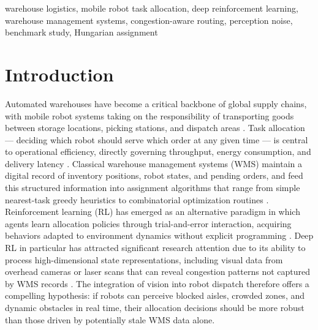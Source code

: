 \documentclass[conference]{IEEEtran}
\begin{document}
\begin{IEEEkeywords}
warehouse logistics, mobile robot task allocation, deep reinforcement learning, warehouse management systems, congestion-aware routing, perception noise, benchmark study, Hungarian assignment
\end{IEEEkeywords}


\section{Introduction}

Automated warehouses have become a critical backbone of global supply chains, with mobile robot systems taking on the responsibility of transporting goods between storage locations, picking stations, and dispatch areas \cite{wurman2008coordinating}.
Task allocation --- deciding which robot should serve which order at any given time --- is central to operational efficiency, directly governing throughput, energy consumption, and delivery latency \cite{boysen2019warehousing}.
Classical warehouse management systems (WMS) maintain a digital record of inventory positions, robot states, and pending orders, and feed this structured information into assignment algorithms that range from simple nearest-task greedy heuristics to combinatorial optimization routines \cite{enright2011optimization}.
Reinforcement learning (RL) has emerged as an alternative paradigm in which agents learn allocation policies through trial-and-error interaction, acquiring behaviors adapted to environment dynamics without explicit programming \cite{sutton2018reinforcement}.
Deep RL in particular has attracted significant research attention due to its ability to process high-dimensional state representations, including visual data from overhead cameras or laser scans that can reveal congestion patterns not captured by WMS records \cite{li2021reinforcement}.
The integration of vision into robot dispatch therefore offers a compelling hypothesis: if robots can perceive blocked aisles, crowded zones, and dynamic obstacles in real time, their allocation decisions should be more robust than those driven by potentially stale WMS data alone.
\end{document}
